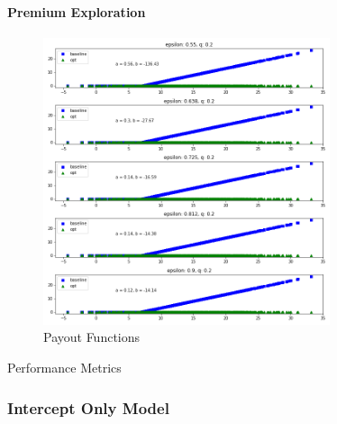 \documentclass[11pt]{article}
\begin{document}
            \paragraph*{Premium Exploration}
                \begin{figure}[H]
                    \centering
                    \caption{Payout Functions}
                    \includegraphics[width=0.75\textwidth]{../../output/figures/Premium/loss_q_exploration_full.png}
                \end{figure}

                \begin{table}[H]
                    \centering
                    \caption{Performance Metrics}
                    
                \end{table}

                \FloatBarrier

    \subsubsection*{Intercept Only Model}
\end{document}

